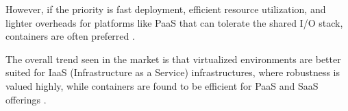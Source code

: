 However, if the priority is fast deployment, efficient resource utilization, and lighter overheads for platforms like PaaS that can tolerate the shared I/O stack, containers are often preferred \cite{Comparison_of_Containerization_and_Virtualization_in_Cloud_Architectures}.

The overall trend seen in the market is that virtualized environments are better suited for IaaS (Infrastructure as a Service) infrastructures, where robustness is valued highly, while containers are found to be efficient for PaaS and SaaS offerings \cite{Comparison_of_Containerization_and_Virtualization_in_Cloud_Architectures}.